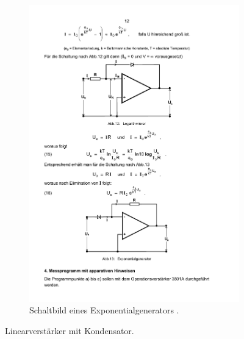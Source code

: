 \begin{figure}
\begin{subfigure}{.49\linewidth}
        \includegraphics[width=1.0\linewidth]{img/expo.pdf}
        \caption{Schaltbild eines Exponentialgenerators \cite{V51}.}
        \label{fig:expo}
    \end{subfigure}
    \caption{Linearverstärker mit Kondensator.}
    \label{fig:log_expo}
\end{figure}


